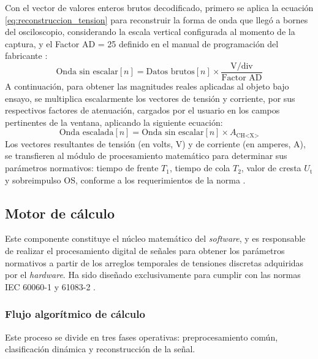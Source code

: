 Con el vector de valores enteros brutos decodificado, primero se aplica la ecuación \eqref{eq:reconstruccion_tension} para reconstruir la forma de onda que llegó a bornes del osciloscopio, considerando la escala vertical configurada al momento de la captura, y el Factor AD = \num{25} definido en el manual de programación del fabricante \cite{gds1000au_ProgrammingManual}:
\begin{equation}
    \text{Onda sin escalar}[n] = \text{Datos brutos}[n] \times \frac{{\text
    {V/div}}}{\text{Factor AD}}
    \label{eq:reconstruccion_tension}
\end{equation}
A continuación, para obtener las magnitudes reales aplicadas al objeto bajo ensayo, se multiplica escalarmente los vectores de tensión y corriente, por sus respectivos factores de atenuación, cargados por el usuario en los campos pertinentes de la ventana, aplicando la siguiente ecuación:
\begin{equation}
    {\text{Onda escalada}}[n] = \text{Onda sin escalar}[n] \times A_{\text{CH<X>}}
    \label{eq:reconstruccion_tension_total}
\end{equation}
Los vectores resultantes de tensión (en volts, \unit{\volt}) y de corriente (en amperes, \unit{\ampere}), se transfieren al módulo de procesamiento matemático para determinar sus parámetros normativos: tiempo de frente $T_1$, tiempo de cola $T_2$, valor de cresta $U_{\text{t}}$ y sobreimpulso OS, conforme a los requerimientos de la norma \cite{iec60060_1}.

\subsection{Motor de cálculo}
\label{subsec:motor_calculo}

Este componente constituye el núcleo matemático del \emph{software}, y es responsable de realizar el procesamiento digital de señales para obtener los parámetros normativos a partir de los arreglos temporales de tensiones discretas adquiridas por el \emph{hardware}. Ha sido diseñado exclusivamente para cumplir con las normas IEC 60060-1 \cite{iec60060_1} y 61083-2 \cite{iec61083_2}.

\subsubsection{Flujo algorítmico de cálculo}
\label{subsubsec:flujo_algoritmico}

Este proceso se divide en tres fases operativas: preprocesamiento común, clasificación dinámica y reconstrucción de la señal.


